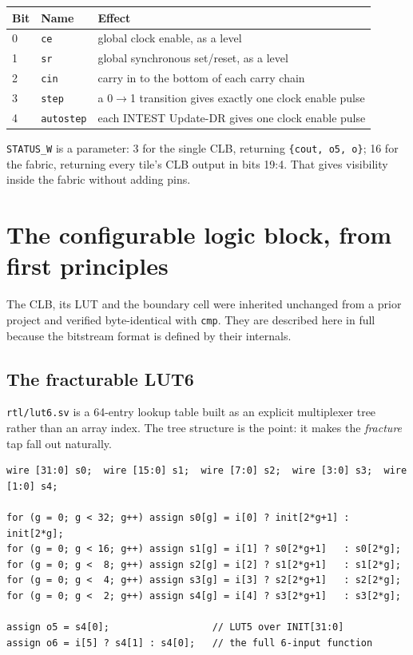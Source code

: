 \documentclass[11pt,a4paper]{article}
\newcommand{\file}[1]{\texttt{#1}}
\newcommand{\sig}[1]{\texttt{#1}}
\begin{document}
\begin{center}
\begin{tabular}{lll}
\toprule
\textbf{Bit} & \textbf{Name} & \textbf{Effect} \\
\midrule
0 & \sig{ce}       & global clock enable, as a level \\
1 & \sig{sr}       & global synchronous set/reset, as a level \\
2 & \sig{cin}      & carry in to the bottom of each carry chain \\
3 & \sig{step}     & a 0$\rightarrow$1 transition gives exactly one clock enable pulse \\
4 & \sig{autostep} & each INTEST Update-DR gives one clock enable pulse \\
\bottomrule
\end{tabular}
\end{center}

\texttt{STATUS\_W} is a parameter: 3 for the single CLB, returning
\texttt{\{cout, o5, o\}}; 16 for the fabric, returning every tile's CLB output
in bits 19:4. That gives visibility inside the fabric without adding pins.

\section{The configurable logic block, from first principles}

The CLB, its LUT and the boundary cell were inherited unchanged from a prior
project and verified byte-identical with \texttt{cmp}. They are described here
in full because the bitstream format is defined by their internals.

\subsection{The fracturable LUT6}

\file{rtl/lut6.sv} is a 64-entry lookup table built as an explicit multiplexer
tree rather than an array index. The tree structure is the point: it makes the
\emph{fracture} tap fall out naturally.

\begin{lstlisting}[style=v]
wire [31:0] s0;  wire [15:0] s1;  wire [7:0] s2;  wire [3:0] s3;  wire [1:0] s4;

for (g = 0; g < 32; g++) assign s0[g] = i[0] ? init[2*g+1] : init[2*g];
for (g = 0; g < 16; g++) assign s1[g] = i[1] ? s0[2*g+1]   : s0[2*g];
for (g = 0; g <  8; g++) assign s2[g] = i[2] ? s1[2*g+1]   : s1[2*g];
for (g = 0; g <  4; g++) assign s3[g] = i[3] ? s2[2*g+1]   : s2[2*g];
for (g = 0; g <  2; g++) assign s4[g] = i[4] ? s3[2*g+1]   : s3[2*g];

assign o5 = s4[0];                  // LUT5 over INIT[31:0]
assign o6 = i[5] ? s4[1] : s4[0];   // the full 6-input function
\end{lstlisting}
\end{document}
